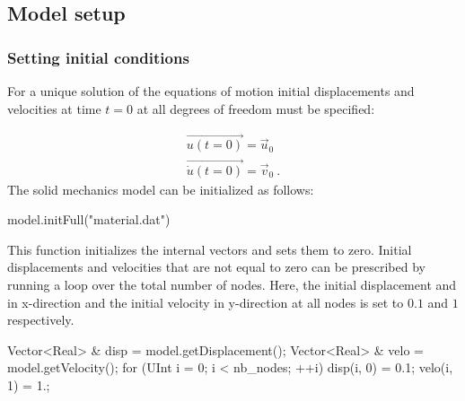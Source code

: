 \subsection{Model setup}

\subsubsection{Setting   initial  conditions  \label{sect:smm:initial_condition}}

For  a unique  solution of  the equations  of motion  initial  displacements and
velocities at time $t=0$ at all degrees of freedom must be specified:

\begin{eqnarray}
  \vec{u(t=0)} = \vec{u}_{0}\\
  \vec{\dot u(t=0)} = \vec{v}_{0}~.
\end{eqnarray}
The solid mechanics model can be initialized as follows:
\begin{cpp}
  model.initFull("material.dat")
\end{cpp}
This function  initializes the internal vectors  and sets them  to zero. Initial
displacements and  velocities that are  not equal to  zero can be  prescribed by
running a  loop over the total  number of nodes. Here,  the initial displacement
and in x-direction  and the initial velocity in y-direction at  all nodes is set
to $0.1$ and $1$ respectively.
\begin{cpp}
  Vector<Real> & disp = model.getDisplacement();
  Vector<Real> & velo = model.getVelocity();
  for (UInt i = 0; i < nb_nodes; ++i) {
    disp(i, 0) = 0.1;
    velo(i, 1) = 1.;
  }
\end{cpp}

